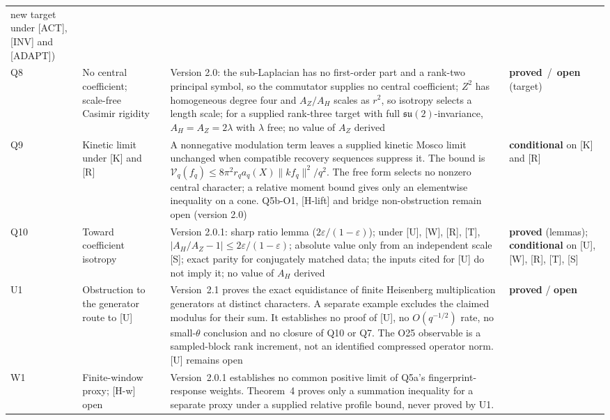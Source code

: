 \documentclass[11pt,a4paper]{article}
\newcommand{\sproved}{\textcolor{cproved}{\textbf{proved}}}
\newcommand{\sopen}{\textcolor{copen}{\textbf{open}}}
\newcommand{\scond}{\textcolor{ccond}{\textbf{conditional}}}
\begin{document}
\begin{longtable}{@{}p{1.70cm}p{2.9cm}p{1.3cm}p{6.25cm}>{\raggedright\arraybackslash}p{2.0cm}@{}}
      new target under [ACT], [INV] and [ADAPT]) \\[3pt]
      Q8 & No central coefficient; scale-free Casimir rigidity & \cite{BeauQ8} &
      Version 2.0: the sub-Laplacian has no first-order part and a rank-two principal symbol, so the
      commutator supplies no central coefficient; $Z^2$ has homogeneous degree four and $A_Z/A_H$ scales as
      $r^2$, so isotropy selects a length scale; for a supplied rank-three target with full
      $\mathfrak{su}(2)$-invariance, $A_H=A_Z=2\lambda$ with $\lambda$ free; no value of $A_Z$ derived &
      \sproved\ /\ \sopen{} (target) \\[3pt]
      Q9 & Kinetic limit under [K] and [R] & \cite{Beau2026q9} &
      A nonnegative modulation term leaves a supplied kinetic Mosco limit unchanged when
      compatible recovery sequences suppress it. The bound is
      $\mathcal V_q(f_q)\le8\pi^2r_q a_q(X)\|kf_q\|^2/q^2$.
      The free form selects no nonzero central character; a relative moment bound gives only an
      elementwise inequality on a cone. Q5b-O1, [H-lift] and bridge non-obstruction remain open
      (version 2.0) &
      \scond{} on [K] and [R] \\[3pt]
      Q10 & Toward coefficient isotropy & \cite{Beau2026q10} &
      Version 2.0.1: sharp ratio lemma ($2\varepsilon/(1-\varepsilon)$); under [U], [W], [R], [T],
      $|A_H/A_Z-1|\le 2\varepsilon/(1-\varepsilon)$; absolute value only from an independent scale [S];
      exact parity for conjugately matched data; the inputs cited for [U] do not imply it; no value of
      $A_H$ derived &
      \sproved{} (lemmas); \scond{} on [U], [W], [R], [T], [S] \\[3pt]
      U1 & Obstruction to the generator route to [U] & \cite{Beau2026u1} &
      Version~2.1 proves the exact equidistance of finite Heisenberg multiplication
      generators at distinct characters.
      A separate example excludes the claimed modulus for their sum.
      It establishes no proof of [U], no
      $O(q^{-1/2})$ rate, no small-$\theta$ conclusion and no closure of Q10 or Q7.
      The O25 observable is a sampled-block rank increment, not an identified
      compressed operator norm.
      [U] remains open &
      \sproved{} / \sopen \\[3pt]
      W1 & Finite-window proxy; [H-w] open & \cite{Beau2026w1} &
      Version~2.0.1 establishes no common positive limit of Q5a's
      fingerprint-response weights.
      Theorem~4 proves only a summation inequality for a separate proxy under a supplied
      relative profile bound, never proved by U1.

\end{longtable}
\end{document}

